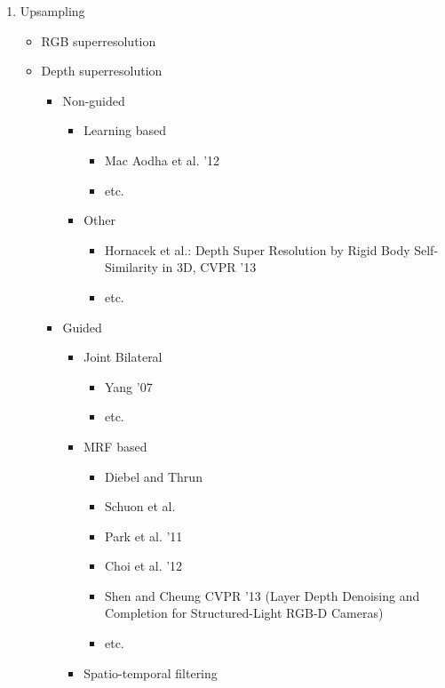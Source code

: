 \documentclass{ucl_thesis}
\begin{document}
\begin{enumerate}
		\item Upsampling
		\begin{itemize}
			\item RGB superresolution
			\item Depth superresolution
			\begin{itemize}
				\item Non-guided
				\begin{itemize}
					\item Learning based
						\begin{itemize}
							\item Mac Aodha et al. '12
							\item etc.
						\end{itemize}
					\item Other
					\begin{itemize}
						\item Hornacek et al.: Depth Super Resolution by Rigid Body Self-Similarity in 3D, CVPR '13
						\item etc.
					\end{itemize}
				\end{itemize}
				
				\item Guided
				\begin{itemize}
					\item Joint Bilateral
					\begin{itemize}
						\item Yang '07
						\item etc.
					\end{itemize}
					\item MRF based
					\begin{itemize}
						\item Diebel and Thrun
						\item Schuon et al.
						\item Park et al. '11
						\item Choi et al. '12
						\item Shen and Cheung CVPR '13 (Layer Depth Denoising and Completion for Structured-Light RGB-D Cameras)
						\item etc.
					\end{itemize}
					
					\item Spatio-temporal filtering
					
				\end{itemize}
			\end{itemize}
		\end{itemize}
		

\end{enumerate}
\end{document}
